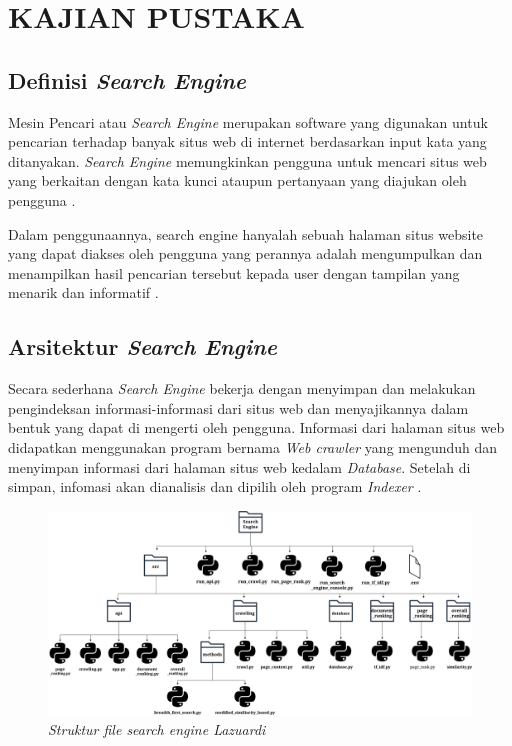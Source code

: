 
\chapter{KAJIAN PUSTAKA} 

\section{Definisi \emph{Search Engine}}

Mesin Pencari atau \emph{Search Engine} merupakan software yang digunakan untuk pencarian terhadap banyak situs web di internet berdasarkan input kata yang ditanyakan. \emph{Search Engine} memungkinkan pengguna untuk mencari situs web yang berkaitan dengan kata kunci ataupun pertanyaan yang diajukan oleh pengguna \citep{seymour2011history}.

Dalam penggunaannya, search engine hanyalah sebuah halaman situs website yang dapat diakses oleh pengguna yang perannya adalah mengumpulkan dan menampilkan hasil pencarian tersebut kepada user dengan tampilan yang menarik dan informatif \citep{seymour2011history}.

\section{Arsitektur \emph{Search Engine}}

Secara sederhana \emph{Search Engine} bekerja dengan menyimpan dan melakukan pengindeksan informasi-informasi dari situs web dan menyajikannya dalam bentuk yang dapat di mengerti oleh pengguna. Informasi dari halaman situs web didapatkan menggunakan program bernama \emph{Web crawler} yang mengunduh dan menyimpan informasi dari halaman situs web kedalam \emph{Database}. Setelah di simpan, infomasi akan dianalisis dan dipilih oleh program \emph{Indexer} \citep{lazuardithesis}.

\begin{figure}[H]
	\centering
	\includegraphics[keepaspectratio, width=14.5cm]{gambar/diagram-new.png}
  \caption{\emph{Struktur file \emph{search engine} Lazuardi} \citep{lazuardithesis}}
	\label{gambar:google_architecture}
\end{figure}

